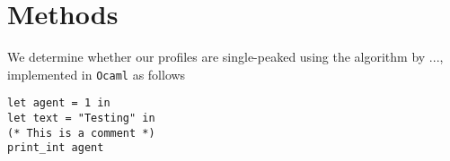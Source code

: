 \chapter{Methods}
\label{Methods}



We determine whether our profiles are single-peaked using the algorithm by ..., implemented in \texttt{Ocaml} as follows

\begin{lstlisting}[language=caml]
let agent = 1 in
let text = "Testing" in
(* This is a comment *)
print_int agent
\end{lstlisting}

